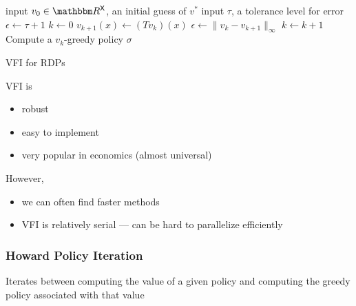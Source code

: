 \begin{frame}
    
{\small 
    \begin{algorithm}[H]
    \DontPrintSemicolon
    input $v_0 \in \RR^\Xsf$, an initial guess of $v^*$ \;
    input $\tau$, a tolerance level for error \;
    $\epsilon \leftarrow \tau + 1$ \;
    $k \leftarrow 0$ \;
    \While{$\epsilon > \tau $}
    {
        {
            $v_{k+1}(x) \leftarrow (Tv_k) (x)$ \;
        }
        $\epsilon \leftarrow \| v_k - v_{k+1} \|_\infty$ \;
        $k \leftarrow k + 1$ \;
    }
    Compute a $v_k$-greedy policy $\sigma$ \;
    \Return{$\sigma$}
    \caption{VFI for RDPs}
    \end{algorithm}
}

\end{frame}

\begin{frame}
    

    VFI is 
    \begin{itemize}
        \item robust
        \vspace{0.5em}
        \item easy to implement 
        \vspace{0.5em}
        \item very popular in economics (almost universal)
    \end{itemize}

    \vspace{0.5em}
    \vspace{0.5em}
    \vspace{0.5em}
    However, 
    \begin{itemize}
        \item we can often find faster methods 
        \vspace{0.5em}
        \item VFI is relatively serial  --- can be hard to parallelize efficiently
    \end{itemize}

\end{frame}


\begin{frame}
    \frametitle{Howard Policy Iteration}

    \begin{figure}
       \begin{center}
           \scalebox{0.7}{}
        \vspace{1em}
       \end{center}
    \end{figure}

    Iterates between computing the value of a given policy
    and computing the greedy policy associated with that value

\end{frame}


